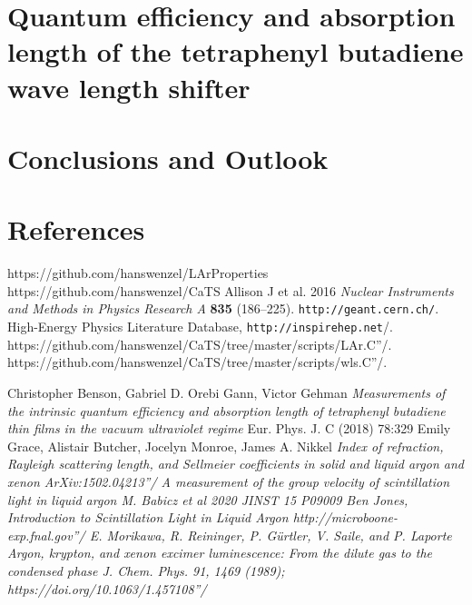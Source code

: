 \documentclass[a4paper]{jpconf}
\begin{document}
\section{Quantum efficiency and absorption length of the tetraphenyl butadiene wave length shifter}

\section{Conclusions and Outlook}

 \section*{References}

 \begin{thebibliography}{99}
   https://github.com/hanswenzel/LArProperties
   https://github.com/hanswenzel/CaTS
 Allison J et al. 2016 {\it Nuclear Instruments and Methods in Physics
                Research A} {\bf 835} (186--225).
 \verb|http://geant.cern.ch/|.
 High-Energy Physics Literature Database,
  \verb"http://inspirehep.net"/.
  \verb''https://github.com/hanswenzel/CaTS/tree/master/scripts/LAr.C''/.
  \verb''https://github.com/hanswenzel/CaTS/tree/master/scripts/wls.C''/.

 Christopher Benson, Gabriel D. Orebi Gann, Victor Gehman
  {\it Measurements of the intrinsic quantum efficiency and absorption
      length of tetraphenyl butadiene thin films in the vacuum
      ultraviolet regime}
Eur. Phys. J. C (2018) 78:329
Emily Grace, Alistair Butcher, Jocelyn Monroe, James A. Nikkel
  \it{Index of refraction, Rayleigh scattering length, and Sellmeier coefficients in solid and liquid argon and xenon}
  \verb'' ArXiv:1502.04213''/
  \it{A measurement of the group velocity of scintillation light in liquid argon}
  M. Babicz et al 2020 JINST 15 P09009
  Ben Jones, \it{Introduction to Scintillation Light in Liquid Argon}
  \verb''http://microboone-exp.fnal.gov''/
  E. Morikawa, R. Reininger, P. Gürtler, V. Saile, and P. Laporte
\it{Argon, krypton, and xenon excimer luminescence: From the dilute gas to the
condensed phase}
J. Chem. Phys. 91, 1469 (1989);
  \verb''https://doi.org/10.1063/1.457108''/


  
\end{thebibliography}
\end{document}
